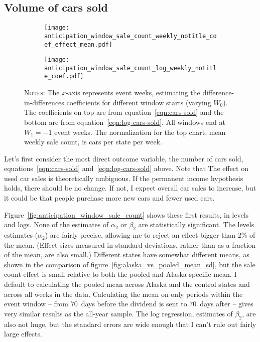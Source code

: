\documentclass[11pt,letterpaper,oneside]{article}
\newcommand{\snippet}[1]{\hspace{-0.15em}}
\begin{document}
\begin{doublespacing}
\subsection{Volume of cars sold}

\begin{figure}[!hbtp]
    \caption{$\alpha_2$ and $\beta_2$, the treatment coefficients on Alaska $\times$ anticipation, for varying windows}
    \label{fig:anticipation_window_sale_count}
    \begin{subfigure}{\linewidth}
    \texttt{[image: anticipation\_window\_sale\_count\_weekly\_notitle\_coef\_effect\_mean.pdf]}
    \end{subfigure}
    \begin{subfigure}{\linewidth}
    \texttt{[image: anticipation\_window\_sale\_count\_log\_weekly\_notitle\_coef.pdf]}
    \end{subfigure}

    {\footnotesize
    \textsc{Notes:}
    The $x$-axis represents event weeks, estimating the difference\hyp{}in\hyp{}differences coefficients for different window starts (varying $W_0$).
    The coefficients on top are from equation~\ref{eqn:cars-sold} and the bottom are from equation~\ref{eqn:log-cars-sold}.
    All windows end at $W_1 = -1$ event weeks.
    The normalization for the top chart, mean weekly sale count, is \snippet{sales_count_weekly_mean.tex} cars per state per week.
    }
\end{figure}


Let's first consider the most direct outcome variable, the number of cars sold, equations~\ref{eqn:cars-sold} and~\ref{eqn:log-cars-sold} above.
Note that The effect on used car sales is theoretically ambiguous.
If the permanent income hypothesis holds, there should be no change.
If not, I expect overall car sales to increase, but it could be that people purchase more new cars and fewer used cars.

Figure~\ref{fig:anticipation_window_sale_count} shows these first results, in levels and logs.
None of the estimates of $\alpha_2$ or $\beta_2$ are statistically significant.
The levels estimates ($\alpha_2$) are fairly precise, allowing me to reject an effect bigger than 2\% of the mean.
(Effect sizes measured in standard deviations, rather than as a fraction of the mean, are also small.)
Different states have somewhat different means, as shown in the comparison of figure~\ref{fig:alaska_vs_pooled_mean_sd}, but the sale count effect is small relative to both the pooled and Alaska\hyp{}specific mean.
I default to calculating the pooled mean across Alaska and the control states and across all weeks in the data.
Calculating the mean on only periods within the event window -- from 70~days before the dividend is sent to 70~days after -- gives very similar results as the all\hyp{}year sample.
The log regression, estimates of $\beta_2$, are also not huge, but the standard errors are wide enough that I can't rule out fairly large effects.


\end{doublespacing}
\end{document}
